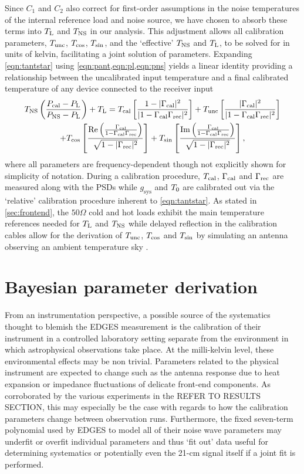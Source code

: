 Since $C_1$ and $C_2$ also correct for first-order assumptions in the noise temperatures of the internal reference load and noise source, we have chosen to absorb these terms into $T_{\mathrm{L}}$ and $T_{\mathrm{NS}}$ in our analysis. This adjustment allows all calibration parameters, $T_{\mathrm{unc}}$, $T_{\mathrm{cos}}$, $T_{\mathrm{sin}}$, and the ‘effective’ $T_{\mathrm{NS}}$ and $T_{\mathrm{L}}$, to be solved for in units of kelvin, facilitating a joint solution of parameters. Expanding \cref{eqn:tantstar} using \cref{eqn:pant,eqn:pl,eqn:pns} yields a linear identity providing a relationship between the uncalibrated input temperature and a final calibrated temperature of any device connected to the receiver input
\begin{multline}
  \label{eqn:caleqn}
  T_{\mathrm{NS}}\left( \frac{P_{\mathrm{cal}} - P_{\mathrm{L}}}{P_{\mathrm{NS}} - P_{\mathrm{L}}} \right) + T_{\mathrm{L}} = T_{\mathrm{cal}}\left[ \frac{1-|\Gamma_{\mathrm{cal}}|^2}{|1-\Gamma_{\mathrm{cal}}\Gamma_{\mathrm{rec}}|^2} \right]
  + T_{\mathrm{unc}}\left[ \frac{|\Gamma_{\mathrm{cal}}|^2}{|1-\Gamma_{\mathrm{cal}}\Gamma_{\mathrm{rec}}|^2} \right] \\
  + T_{\mathrm{cos}}\left[ \frac{\operatorname{Re}\left(\frac{\Gamma_{\mathrm{cal}}}{1-\Gamma_{\mathrm{cal}}\Gamma_{\mathrm{rec}}}\right)}{\sqrt{1-|\Gamma_{\mathrm{rec}}|^2}} \right]
  + T_{\mathrm{sin}}\left[ \frac{\operatorname{Im}\left(\frac{\Gamma_{\mathrm{cal}}}{1-\Gamma_{\mathrm{cal}}\Gamma_{\mathrm{rec}}}\right)}{\sqrt{1-|\Gamma_{\mathrm{rec}}|^2}} \right],
\end{multline}
where all parameters are frequency-dependent though not explicitly shown for simplicity of notation. During a calibration procedure, $T_{\mathrm{cal}}$, $\Gamma_{\mathrm{cal}}$ and $\Gamma_{\mathrm{rec}}$ are measured along with the PSDs while $g_{\mathrm{sys}}$ and $T_{\mathrm{0}}$ are calibrated out via the `relative' calibration procedure inherent to \cref{eqn:tantstar}. As stated in \cref{sec:frontend}, the $50 \Omega$ cold and hot loads exhibit the main temperature references needed for $T_{\mathrm{L}}$ and $T_{\mathrm{NS}}$ while delayed reflection in the calibration cables allow for the derivation of $T_{\mathrm{unc}}$, $T_{\mathrm{cos}}$ and $T_{\mathrm{sin}}$ by simulating an antenna observing an ambient temperature sky \citep{rogersCal}.


\section{Bayesian parameter derivation}\label{sec:bayes}
From an instrumentation perspective, a possible source of the systematics thought to blemish the EDGES measurement is the calibration of their instrument in a controlled laboratory setting separate from the environment in which astrophysical observations take place. At the milli-kelvin level, these environmental effects may be non trivial. Parameters related to the physical instrument are expected to change such as the antenna response due to heat expansion or impedance fluctuations of delicate front-end components. As corroborated by the various experiments in the REFER TO RESULTS SECTION, this may especially be the case with regards to how the calibration parameters change between observation runs. Furthermore, the fixed seven-term polynomial used by EDGES to model all of their noise wave parameters may underfit or overfit individual parameters and thus `fit out' data useful for determining systematics or potentially even the 21-cm signal itself if a joint fit is performed.

